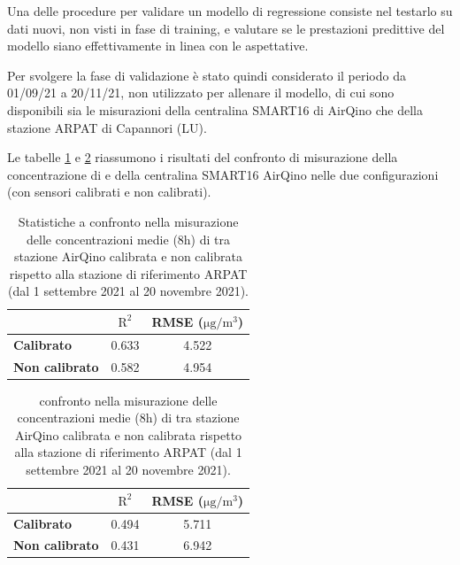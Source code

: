 Una delle procedure per validare un modello di regressione consiste nel testarlo su dati nuovi, non visti in fase di training, e valutare se le prestazioni predittive del modello siano effettivamente in linea con le aspettative.

Per svolgere la fase di validazione è stato quindi considerato il periodo da 01/09/21 a 20/11/21, non utilizzato per allenare il modello, di cui sono disponibili sia le misurazioni della centralina SMART16 di AirQino che della stazione ARPAT di Capannori (LU).

Le tabelle \ref{tab:val-pm25} e \ref{tab:val-pm10} riassumono i risultati del confronto di misurazione della concentrazione di  e  della centralina SMART16 AirQino nelle due configurazioni (con sensori calibrati e non calibrati).

\begin{table}[H]
\footnotesize
\centering
\begin{tabular}{|l|c|c|}
\cline{2-3}
\multicolumn{1}{c|}{} & $\bm{\mathrm{R^2}}$ & \textbf{RMSE (}$\mathrm{\si{\micro}g/m^3}$) \\ \hline
\textbf{Calibrato} & 0.633 & 4.522 \\ \hline
\textbf{Non calibrato} & 0.582 & 4.954 \\ \hline
\end{tabular}
\caption{Statistiche a confronto nella misurazione delle concentrazioni medie (8h) di  tra stazione AirQino calibrata e non calibrata rispetto alla stazione di riferimento ARPAT (dal 1 settembre 2021 al 20 novembre 2021).}
\label{tab:val-pm25}
\end{table}

\begin{table}[H]
\footnotesize
\centering
\begin{tabular}{|l|c|c|}
\cline{2-3}
\multicolumn{1}{c|}{} & $\bm{\mathrm{R^2}}$ & \textbf{RMSE (}$\mathrm{\si{\micro}g/m^3}$) \\ \hline
\textbf{Calibrato} & 0.494 & 5.711 \\ \hline
\textbf{Non calibrato} & 0.431 & 6.942 \\ \hline
\end{tabular}
\caption{confronto nella misurazione delle concentrazioni medie (8h) di  tra stazione AirQino calibrata e non calibrata rispetto alla stazione di riferimento ARPAT (dal 1 settembre 2021 al 20 novembre 2021).}
\label{tab:val-pm10}
\end{table}

